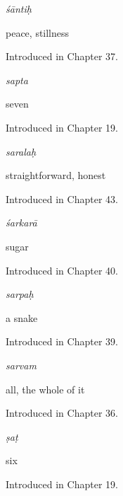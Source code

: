 \noindent\begin{minipage}[t]{\linewidth}
\raggedright
\textbf{}\enspace\emph{śāntiḥ}\par
\small peace, stillness\par
\footnotesize Introduced in Chapter 37.
\end{minipage}\par\medskip

\noindent\begin{minipage}[t]{\linewidth}
\raggedright
\textbf{}\enspace\emph{sapta}\par
\small seven\par
\footnotesize Introduced in Chapter 19.
\end{minipage}\par\medskip

\noindent\begin{minipage}[t]{\linewidth}
\raggedright
\textbf{}\enspace\emph{saralaḥ}\par
\small straightforward, honest\par
\footnotesize Introduced in Chapter 43.
\end{minipage}\par\medskip

\noindent\begin{minipage}[t]{\linewidth}
\raggedright
\textbf{}\enspace\emph{śarkarā}\par
\small sugar\par
\footnotesize Introduced in Chapter 40.
\end{minipage}\par\medskip

\noindent\begin{minipage}[t]{\linewidth}
\raggedright
\textbf{}\enspace\emph{sarpaḥ}\par
\small a snake\par
\footnotesize Introduced in Chapter 39.
\end{minipage}\par\medskip

\noindent\begin{minipage}[t]{\linewidth}
\raggedright
\textbf{}\enspace\emph{sarvam}\par
\small all, the whole of it\par
\footnotesize Introduced in Chapter 36.
\end{minipage}\par\medskip

\noindent\begin{minipage}[t]{\linewidth}
\raggedright
\textbf{}\enspace\emph{ṣaṭ}\par
\small six\par
\footnotesize Introduced in Chapter 19.
\end{minipage}\par\medskip


